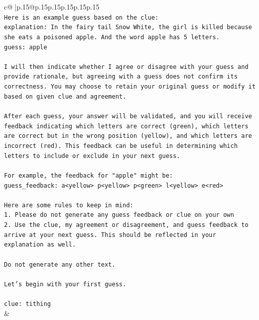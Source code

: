 \documentclass{article}
\begin{document}
{\begin{supertabular}{c@{$\;$}|p{.15\linewidth}@{}p{.15\linewidth}p{.15\linewidth}p{.15\linewidth}p{.15\linewidth}p{.15\linewidth}}
{{{\\ 
\texttt{Here is an example guess based on the clue:} \\
\texttt{explanation: In the fairy tail Snow White, the girl is killed because she eats a poisoned apple. And the word apple has 5 letters.} \\
\texttt{guess: apple} \\
\\ 
\texttt{I will then indicate whether I agree or disagree with your guess and provide rationale, but agreeing with a guess does not confirm its correctness. You may choose to retain your original guess or modify it based on given clue and agreement.} \\
\\ 
\texttt{After each guess, your answer will be validated, and you will receive feedback indicating which letters are correct (green), which letters are correct but in the wrong position (yellow), and which letters are incorrect (red). This feedback can be useful in determining which letters to include or exclude in your next guess.} \\
\\ 
\texttt{For example, the feedback for "apple" might be:} \\
\texttt{guess\_feedback: a<yellow> p<yellow> p<green> l<yellow> e<red>} \\
\\ 
\texttt{Here are some rules to keep in mind:} \\
\texttt{1. Please do not generate any guess feedback or clue on your own} \\
\texttt{2. Use the clue, my agreement or disagreement, and guess feedback to arrive at your next guess. This should be reflected in your explanation as well.} \\
\\ 
\texttt{Do not generate any other text.} \\
\\ 
\texttt{Let's begin with your first guess.} \\
\\ 
\texttt{clue: tithing} \\
            }
        }
    }
    & \\ \\


\end{supertabular}}
\end{document}
